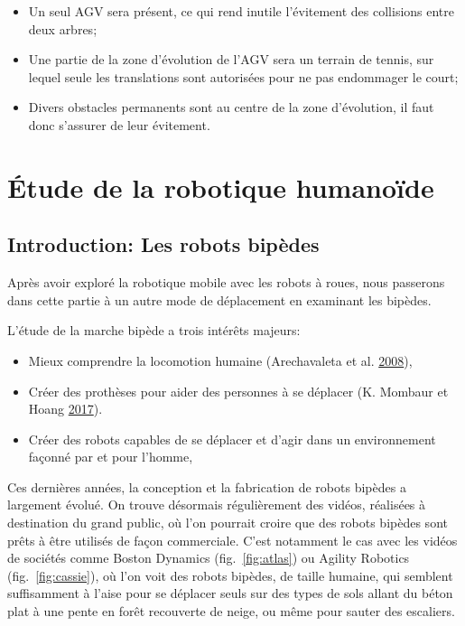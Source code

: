 \documentclass[french,A4paper,]{book}
\providecommand{\tightlist}{%
  \setlength{\itemsep}{0pt}\setlength{\parskip}{0pt}}
\begin{document}
\begin{itemize}
\tightlist
\item
  Un seul AGV sera présent, ce qui rend inutile l'évitement des
  collisions entre deux arbres;
\item
  Une partie de la zone d'évolution de l'AGV sera un terrain de tennis,
  sur lequel seule les translations sont autorisées pour ne pas
  endommager le court;
\item
  Divers obstacles permanents sont au centre de la zone d'évolution, il
  faut donc s'assurer de leur évitement.
\end{itemize}

\part{Étude de la robotique humanoïde}\label{sec:humanoide}

\renewcommand{\thefigure}{\Roman{part}-\arabic{figure}}
\renewcommand{\thetable}{\Roman{part}-\arabic{table}}
\renewcommand{\thealgorithm}{\Roman{part}-\arabic{algorithm}}

\setcounter{figure}{0} \setcounter{table}{0} \setcounter{algorithm}{0}

\chapter*{Introduction: Les robots
bipèdes}\label{introduction-les-robots-bipuxe8des}

Après avoir exploré la robotique mobile avec les robots à roues, nous
passerons dans cette partie à un autre mode de déplacement en examinant
les bipèdes.

L'étude de la marche bipède a trois intérêts majeurs:

\begin{itemize}
\tightlist
\item
  Mieux comprendre la locomotion humaine (Arechavaleta et al.
  \protect\hyperlink{ref-arechavaleta08}{2008}),
\item
  Créer des prothèses pour aider des personnes à se déplacer (K. Mombaur
  et Hoang \protect\hyperlink{ref-mombaur17}{2017}).
\item
  Créer des robots capables de se déplacer et d'agir dans un
  environnement façonné par et pour l'homme,
\end{itemize}

Ces dernières années, la conception et la fabrication de robots bipèdes
a largement évolué. On trouve désormais régulièrement des vidéos,
réalisées à destination du grand public, où l'on pourrait croire que des
robots bipèdes sont prêts à être utilisés de façon commerciale. C'est
notamment le cas avec les vidéos de sociétés comme Boston Dynamics
(fig.~\ref{fig:atlas}) ou Agility Robotics (fig.~\ref{fig:cassie}), où
l'on voit des robots bipèdes, de taille humaine, qui semblent
suffisamment à l'aise pour se déplacer seuls sur des types de sols
allant du béton plat à une pente en forêt recouverte de neige, ou même
pour sauter des escaliers.
\end{document}
